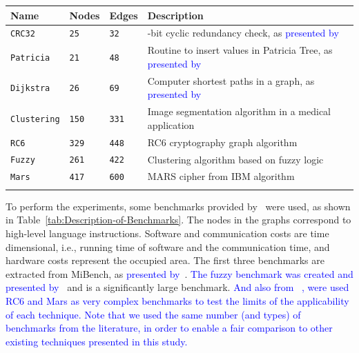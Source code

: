 \documentclass{doublecol-new}
\theoremstyle{TH}{
\newtheorem{lemma}{Lemma}
\newtheorem{theorem}[lemma]{Theorem}
\newtheorem{corrolary}[lemma]{Corrolary}
\newtheorem{conjecture}[lemma]{Conjecture}
\newtheorem{proposition}[lemma]{Proposition}
\newtheorem{claim}[lemma]{Claim}
\newtheorem{stheorem}[lemma]{Wrong Theorem}
\newtheorem{algorithm}{Algorithm}
}
\theoremstyle{THrm}{
\newtheorem{definition}{Definition}[section]
\newtheorem{question}{Question}[section]
\newtheorem{remark}{Remark}
\newtheorem{scheme}{Scheme}
}
\theoremstyle{THhit}{
\newtheorem{case}{Case}[section]
}
\begin{document}
\begin{minipage}{\linewidth}
\centering
\small
\sffamily\small
\tabulinesep=4pt
\begin{tabular}[c]{m{1.5cm}m{0.7cm}m{0.7cm}m{4.0 cm}}
\toprule[1.5pt]
\textbf{Name} & \textbf{Nodes} & \textbf{Edges} & \textbf{Description}\\
\midrule
\verb|CRC32| & \verb|25| & \verb|32| & \rmfamily 32-bit cyclic redundancy check, as \textcolor{blue}{presented by}~\cite{Guthaus2001}\\
\hline
\verb|Patricia| & \verb|21| & \verb|48| & \rmfamily
\vspace{0.8 mm} Routine to insert values in Patricia Tree, as \textcolor{blue}{presented by} ~\cite{Guthaus2001}\\
\hline
\verb|Dijkstra| & \verb|26| & \verb|69| & \rmfamily \vspace{0.8 mm} Computer shortest paths in a graph, as \textcolor{blue}{presented by}~\cite{Guthaus2001}\\
\hline
\verb|Clustering| & \verb|150| & \verb|331| & \rmfamily \vspace{0.8 mm} Image segmentation algorithm in a medical application\\
\hline
\verb|RC6| & \verb|329| & \verb|448| & \rmfamily \vspace{0.8 mm} RC6 cryptography graph algorithm\\
\hline
\verb|Fuzzy| & \verb|261| & \verb|422| & \rmfamily \vspace{0.8 mm} Clustering algorithm based on fuzzy logic\\
\hline
\verb|Mars| & \verb|417| & \verb|600| & \rmfamily 
\vspace{1 mm} MARS cipher from IBM algorithm\\
\bottomrule[1.5pt]
\label{tab:Description-of-Benchmarks} 
\end{tabular}\par
\bigskip
\end{minipage}

\vspace{-3 mm}
To perform the experiments, some benchmarks provided by~\cite{Mann2007} were used, as shown in Table~\ref{tab:Description-of-Benchmarks}. The nodes in the graphs correspond to high-level language instructions. Software and communication costs are time dimensional, i.e., running time of software and the communication time, and hardware costs represent the occupied area. The first three benchmarks are extracted from MiBench, as \textcolor{blue}{presented by}~\cite{Guthaus2001}. \textcolor{blue}{The fuzzy benchmark was created and presented by}~\cite{Mann2007} and is a significantly large benchmark. \textcolor{blue}{And also from ~\cite{Mann2007}, were used RC$6$ and Mars as very complex benchmarks to test the limits of the applicability of each technique. Note that we used the same number (and types) of benchmarks from the literature, in order to enable a fair comparison to other existing techniques presented in this study.}
\end{document}
